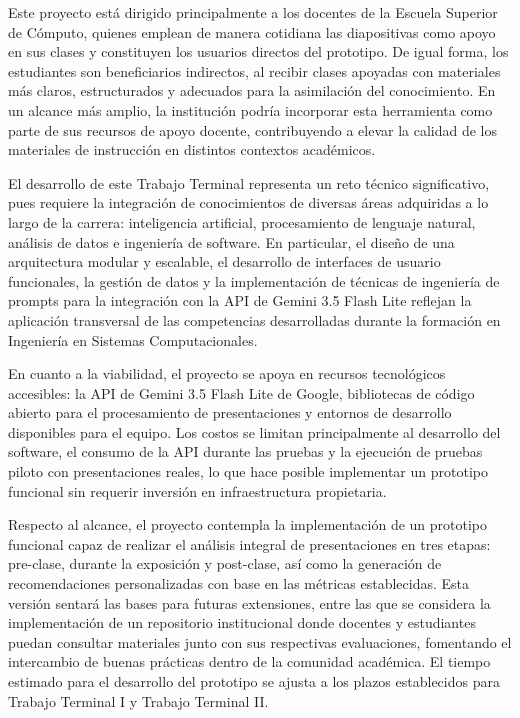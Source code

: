 \documentclass[11pt]{article}
\begin{document}
Este proyecto está dirigido principalmente a los docentes de la Escuela Superior de Cómputo, quienes emplean de manera cotidiana las diapositivas como apoyo en sus clases y constituyen los usuarios directos del prototipo. De igual forma, los estudiantes son beneficiarios indirectos, al recibir clases apoyadas con materiales más claros, estructurados y adecuados para la asimilación del conocimiento. En un alcance más amplio, la institución podría incorporar esta herramienta como parte de sus recursos de apoyo docente, contribuyendo a elevar la calidad de los materiales de instrucción en distintos contextos académicos.

El desarrollo de este Trabajo Terminal representa un reto técnico significativo, pues requiere la integración de conocimientos de diversas áreas adquiridas a lo largo de la carrera: inteligencia artificial, procesamiento de lenguaje natural, análisis de datos e ingeniería de software. En particular, el diseño de una arquitectura modular y escalable, el desarrollo de interfaces de usuario funcionales, la gestión de datos y la implementación de técnicas de ingeniería de prompts para la integración con la API de Gemini 3.5 Flash Lite reflejan la aplicación transversal de las competencias desarrolladas durante la formación en Ingeniería en Sistemas Computacionales.

En cuanto a la viabilidad, el proyecto se apoya en recursos tecnológicos accesibles: la API de Gemini 3.5 Flash Lite de Google, bibliotecas de código abierto para el procesamiento de presentaciones y entornos de desarrollo disponibles para el equipo. Los costos se limitan principalmente al desarrollo del software, el consumo de la API durante las pruebas y la ejecución de pruebas piloto con presentaciones reales, lo que hace posible implementar un prototipo funcional sin requerir inversión en infraestructura propietaria.

Respecto al alcance, el proyecto contempla la implementación de un prototipo funcional capaz de realizar el análisis integral de presentaciones en tres etapas: pre-clase, durante la exposición y post-clase, así como la generación de recomendaciones personalizadas con base en las métricas establecidas. Esta versión sentará las bases para futuras extensiones, entre las que se considera la implementación de un repositorio institucional donde docentes y estudiantes puedan consultar materiales junto con sus respectivas evaluaciones, fomentando el intercambio de buenas prácticas dentro de la comunidad académica. El tiempo estimado para el desarrollo del prototipo se ajusta a los plazos establecidos para Trabajo Terminal I y Trabajo Terminal II.
\end{document}
